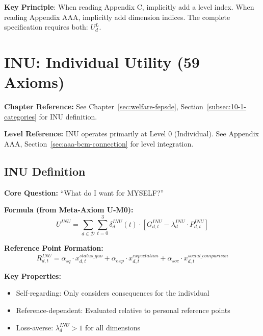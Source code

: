 \textbf{Key Principle}: When reading Appendix C, implicitly add a level index. 
When reading Appendix AAA, implicitly add dimension indices. The complete 
specification requires both: $U^L_d$.

\section{INU: Individual Utility (59 Axioms)}
\label{sec:app-c-inu}

\begin{cross-reference}
\textbf{Chapter Reference:} See Chapter~\ref{sec:welfare-fepsde}, 
Section~\ref{subsec:10-1-categories} for INU definition.

\textbf{Level Reference:} INU operates primarily at Level 0 (Individual). 
See Appendix AAA, Section~\ref{sec:aaa-bcm-connection} for level integration.
\end{cross-reference}

\subsection{INU Definition}

\begin{tcolorbox}[colback=blue!5!white, colframe=blue!75!black, 
    title=Individual Utility (INU)]

\textbf{Core Question:} ``What do I want for MYSELF?''

\textbf{Formula (from Meta-Axiom U-M0):}
\begin{equation}
U^{INU} = \sum_{d \in \mathcal{D}} \sum_{t=0}^{3} \delta^{INU}_{d}(t) \cdot 
\left[ G^{INU}_{d,t} - \lambda^{INU}_{d} \cdot P^{INU}_{d,t} \right]
\end{equation}

\textbf{Reference Point Formation:}
\begin{equation}
R^{INU}_{d,t} = \alpha_{sq} \cdot x^{status\_quo}_{d,t} + 
               \alpha_{exp} \cdot x^{expectation}_{d,t} + 
               \alpha_{soc} \cdot x^{social\_comparison}_{d,t}
\end{equation}

\textbf{Key Properties:}
\begin{itemize}
\item Self-regarding: Only considers consequences for the individual
\item Reference-dependent: Evaluated relative to personal reference points
\item Loss-averse: $\lambda^{INU}_d > 1$ for all dimensions
\end{itemize}

\end{tcolorbox}

